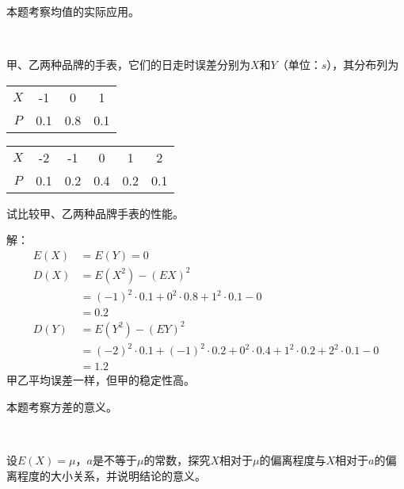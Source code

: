 \begin{tcolorbox}
本题考察均值的实际应用。
\end{tcolorbox}

~

\begin{example}
甲、乙两种品牌的手表，它们的日走时误差分别为$X$和$Y$（单位：$s$），其分布列为

\begin{table}[h]
\centering
\begin{tabular}{cccc}
    \toprule
    $X$ & -1 & 0 & 1\\
    $P$ & 0.1 & 0.8 & 0.1\\
    \bottomrule
\end{tabular}
\end{table}

\begin{table}[h]
\centering
\begin{tabular}{cccccc}
    \toprule
    $X$ & -2 & -1 & 0 & 1 & 2\\
    $P$ & 0.1 & 0.2 & 0.4 & 0.2 & 0.1\\
    \bottomrule
\end{tabular}
\end{table}

试比较甲、乙两种品牌手表的性能。
\end{example}

解：
\begin{align*}
E\left( X \right) &=E\left( Y \right) =0 \\
D\left( X \right) &=E\left( X^2 \right) -\left( EX \right) ^2 \\
&=\left( -1 \right) ^2\cdot 0.1+0^2\cdot 0.8+1^2\cdot 0.1-0 \\
&=0.2 \\
D\left( Y \right) &=E\left( Y^2 \right) -\left( EY \right) ^2 \\
&=\left( -2 \right) ^2\cdot 0.1+\left( -1 \right) ^2\cdot 0.2+0^2\cdot 0.4+1^2\cdot 0.2+2^2\cdot 0.1-0 \\
&=1.2
\end{align*}
甲乙平均误差一样，但甲的稳定性高。

\begin{tcolorbox}
本题考察方差的意义。
\end{tcolorbox}

~

\begin{example}
设$E\left( X \right) =\mu $，$a$是不等于$\mu $的常数，探究$X$相对于$\mu $的偏离程度与$X$相对于$a$的偏离程度的大小关系，并说明结论的意义。
\end{example}

